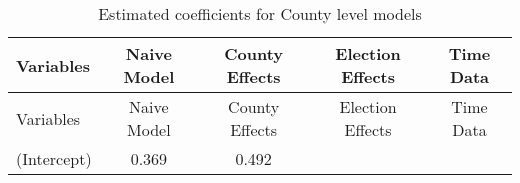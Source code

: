\documentclass[12pt,twoside]{reedthesis}
\begin{document}
  \begin{longtable}[]{@{}lcccc@{}}
  \caption{Estimated coefficients for County level models
  \label{tab:model_county_coefs}}\tabularnewline
  \toprule
  \begin{minipage}[b]{0.23\columnwidth}\raggedright\strut
  Variables\strut
  \end{minipage} & \begin{minipage}[b]{0.14\columnwidth}\centering\strut
  Naive Model\strut
  \end{minipage} & \begin{minipage}[b]{0.18\columnwidth}\centering\strut
  County Effects\strut
  \end{minipage} & \begin{minipage}[b]{0.20\columnwidth}\centering\strut
  Election Effects\strut
  \end{minipage} & \begin{minipage}[b]{0.11\columnwidth}\centering\strut
  Time Data\strut
  \end{minipage}\tabularnewline
  \midrule
  \endfirsthead
  \toprule
  \begin{minipage}[b]{0.23\columnwidth}\raggedright\strut
  Variables\strut
  \end{minipage} & \begin{minipage}[b]{0.14\columnwidth}\centering\strut
  Naive Model\strut
  \end{minipage} & \begin{minipage}[b]{0.18\columnwidth}\centering\strut
  County Effects\strut
  \end{minipage} & \begin{minipage}[b]{0.20\columnwidth}\centering\strut
  Election Effects\strut
  \end{minipage} & \begin{minipage}[b]{0.11\columnwidth}\centering\strut
  Time Data\strut
  \end{minipage}\tabularnewline
  \midrule
  \endhead
  \begin{minipage}[t]{0.23\columnwidth}\raggedright\strut
  (Intercept)\strut
  \end{minipage} & \begin{minipage}[t]{0.14\columnwidth}\centering\strut
  0.369\strut
  \end{minipage} & \begin{minipage}[t]{0.18\columnwidth}\centering\strut
  0.492\strut
  \end{minipage} & \begin{minipage}[t]{0.20\columnwidth}\centering\strut

\end{minipage}
\end{longtable}
\end{document}

